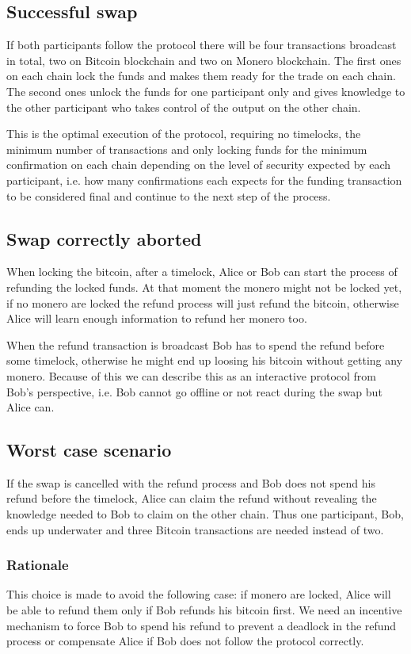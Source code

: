 \documentclass{llncs}
\begin{document}
\subsection{Successful swap}
If both participants follow the protocol there will be four transactions broadcast in total, two on Bitcoin blockchain and two on Monero blockchain. The first ones on each chain lock the funds and makes them ready for the trade on each chain. The second ones unlock the funds for one participant only and gives knowledge to the other participant who takes control of the output on the other chain.

This is the optimal execution of the protocol, requiring no timelocks, the minimum number of transactions and only locking funds for the minimum confirmation on each chain depending on the level of security expected by each participant, i.e. how many confirmations each expects for the funding transaction to be considered final and continue to the next step of the process.

\subsection{Swap correctly aborted}
When locking the bitcoin, after a timelock, Alice or Bob can start the process of refunding the locked funds. At that moment the monero might not be locked yet, if no monero are locked the refund process will just refund the bitcoin, otherwise Alice will learn enough information to refund her monero too.

When the refund transaction is broadcast Bob has to spend the refund before some timelock, otherwise he might end up loosing his bitcoin without getting any monero.  Because of this we can describe this as an interactive protocol from Bob's perspective, i.e. Bob cannot go offline or not react during the swap but Alice can.

\subsection{Worst case scenario}
If the swap is cancelled with the refund process and Bob does not spend his refund before the timelock, Alice can claim the refund without revealing the knowledge needed to Bob to claim on the other chain. Thus one participant, Bob, ends up underwater and three Bitcoin transactions are needed instead of two.

\subsubsection{Rationale}
\label{worstCaseRationale}
This choice is made to avoid the following case: if monero are locked, Alice will be able to refund them only if Bob refunds his bitcoin first. We need an incentive mechanism to force Bob to spend his refund to prevent a deadlock in the refund process or compensate Alice if Bob does not follow the protocol correctly.
\end{document}
